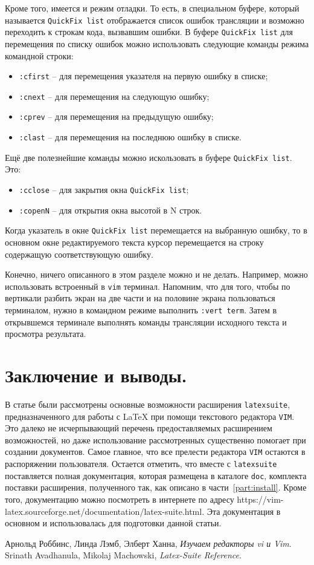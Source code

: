 \documentclass[a4paper]{article}
\begin{document}
Кроме того, имеется и режим отладки. То есть, в специальном буфере, который называется \texttt{QuickFix list}
отображается список ошибок трансляции и возможно переходить к строкам кода, вызвавшим ошибки. 
В буфере \texttt{QuickFix list} для перемещения по списку ошибок можно использовать следующие команды
режима командной строки:
\begin{itemize}
	\item \verb|:cfirst| -- для перемещения указателя на первую ошибку в списке;
	\item \verb|:cnext| -- для перемещения на следующую ошибку;
	\item \verb|:cprev| -- для перемещения на предыдущую ошибку;
	\item \verb|:clast| -- для перемещения на последнюю ошибку в списке.
\end{itemize}
Ещё две полезнейшие команды можно искользовать в буфере \texttt{QuickFix list}. Это:
\begin{itemize}
	\item \verb|:cclose| -- для закрытия окна \texttt{QuickFix list};
	\item \verb|:copenN| -- для открытия окна высотой в N строк.
	\end{itemize}
Когда указатель в окне \texttt{QuickFix list} перемещается на выбранную ошибку, то в основном
окне редактируемого текста курсор перемещается на строку содержащую соответствующую ошибку.

Конечно, ничего описанного в этом разделе можно и не делать. Например, можно использовать
встроенный в \texttt{vim} терминал. Напомним, что для того, чтобы по вертикали разбить 
экран на две части и на половине экрана пользоваться терминалом, нужно в командном режиме
выполнить \texttt{:vert term}. Затем в открывшемся терминале выполнять команды трансляции
исходного текста и просмотра результата. 

\part{Заключение и выводы.}
В статье были рассмотрены основные возможности расширения \texttt{latexsuite}, 
предназначенного для работы с \LaTeX{} при помощи текстового редактора \texttt{VIM}.
Это далеко не исчерпывающий перечень предоставляемых расширением возможностей, но даже 
использование рассмотренных существенно помогает при создании документов. Самое главное, 
что все прелести редактора \texttt{VIM} остаются в распоряжении пользователя. 
Остается отметить, что вместе с \texttt{latexsuite} поставляется полная документация,
которая размещена в каталоге \texttt{doc}, комплекта поставки расширения, полученного
так, как описано в части~\ref{part:install}. Кроме того, документацию можно посмотреть 
в интернете по адресу https://vim-latex.sourceforge.net/documentation/latex-suite.html.
Эта документация \cite{bib-reference-latexsuite} в основном и использовалась для подготовки данной статьи. 
\begin{thebibliography}{99}
	 Арнольд Роббинс, Линда Лэмб, Элберт Ханна, \emph{Изучаем редакторы vi и Vim}. 
	 Srinath Avadhanula, Mikolaj Machowski, \emph{Latex-Suite Reference}.
\end{thebibliography}
\end{document}
